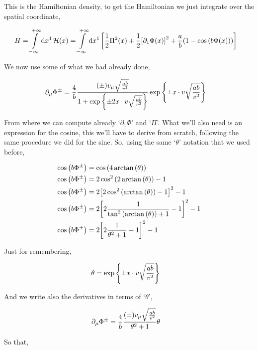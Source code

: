 This is the Hamiltonian density, to get the Hamiltonian we just integrate over 
the spatial coordinate,

\begin{align}
    H&=\int\limits_{-\infty}^{+\infty}\dd{x^1}\mathcal H\qty(x)=\int\limits_{-\infty}^{+\infty}\dd{x^1}\qty[\frac12\Pi^2\qty(x)
    +\frac12\qty[\partial_1\Phi\qty(x)]^2
    +\frac ab\qty(1-\cos\qty(b\Phi\qty(x)))]\nonumber
\end{align}

We now use some of what we had already done,

\begin{align}
    \partial_\mu\Phi^{\pm}&=\frac4b\frac{\qty(\pm)v_\mu\sqrt{\frac{ab}{v^2}}}
        {1+\exp\qty{\pm2x\cdot v\sqrt{\frac{ab}{v^2}}}}
    \exp\qty{\pm x\cdot v\sqrt{\frac{ab}{v^2}}}\nonumber
\end{align}

From where we can compute already `$\partial_1\Phi$' and `$\Pi$'. What we'll also need is 
an expression for the cosine, this we'll have to derive from scratch, following the same 
procedure we did for the sine. So, using the same `$\theta$' notation that we used before,

\begin{align}
    \cos\qty(b\Phi^\pm)&=\cos\qty(4\arctan\qty(\theta))\nonumber\\
    \cos\qty(b\Phi^\pm)&=2\cos^2\qty(2\arctan\qty(\theta))-1\nonumber\\
    \cos\qty(b\Phi^\pm)&=2\qty[2\cos^2\qty(\arctan\qty(\theta))-1]^2-1\nonumber\\
    \cos\qty(b\Phi^\pm)&=2\qty[2\frac{1}{\tan^2\qty(\arctan\qty(\theta))+1}-1]^2-1\nonumber\\
    \cos\qty(b\Phi^\pm)&=2\qty[2\frac{1}{\theta^2+1}-1]^2-1\nonumber
\end{align}

Just for remembering,

\begin{align}
    \theta&=\exp\qty{\pm x\cdot v\sqrt{\frac{ab}{v^2}}}\nonumber
\end{align}

And we write also the derivatives in terms of `$\theta$',

\begin{align}
    \partial_\mu\Phi^{\pm}&=\frac4b\frac{\qty(\pm)v_\mu\sqrt{\frac{ab}{v^2}}}
        {\theta^2+1}
    \theta\nonumber
\end{align}

So that,

